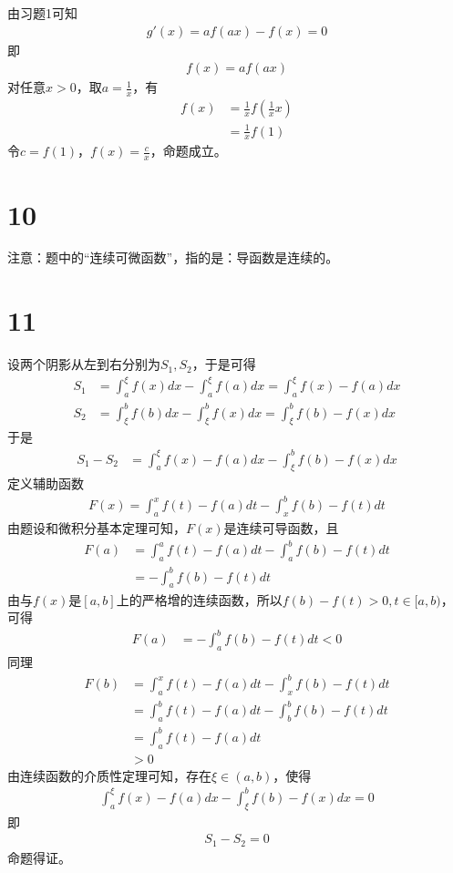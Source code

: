 \documentclass{article}
\begin{document}
由习题1可知
\begin{align*}
  g'(x) = af(ax) - f(x) = 0
\end{align*}
即
\begin{align*}
  f(x) = a f(ax)
\end{align*}
对任意$x > 0$，取$a = \frac{1}{x}$，有
\begin{align*}
  f(x) & = \frac{1}{x} f(\frac{1}{x} x) \\
       & = \frac{1}{x} f(1)
\end{align*}
令$c = f(1)$，$f(x) = \frac{c}{x}$，命题成立。

\section*{10}

注意：题中的“连续可微函数”，指的是：导函数是连续的。

\section*{11}

设两个阴影从左到右分别为$S_1, S_2$，于是可得
\begin{align*}
  S_1 & = \int_{a}^{\xi} f(x) dx - \int_{a}^{\xi} f(a) dx = \int_{a}^{\xi} f(x) - f(a) dx \\
  S_2 & = \int_{\xi}^{b} f(b) dx - \int_{\xi}^{b} f(x) dx = \int_{\xi}^{b} f(b)- f(x) dx
\end{align*}
于是
\begin{align*}
  S_1 - S_2
   & =  \int_{a}^{\xi} f(x) - f(a) dx - \int_{\xi}^{b} f(b)- f(x) dx
\end{align*}
定义辅助函数
\begin{align*}
  F(x) = \int_{a}^{x} f(t) - f(a) dt - \int_{x}^{b} f(b)- f(t) dt
\end{align*}
由题设和微积分基本定理可知，$F(x)$是连续可导函数，且
\begin{align*}
  F(a) & = \int_{a}^{a} f(t) - f(a) dt - \int_{a}^{b} f(b)- f(t) dt \\
       & = - \int_{a}^{b} f(b)- f(t) dt
\end{align*}
由与$f(x)$是$[a, b]$上的严格增的连续函数，所以$f(b) - f(t) > 0, t \in [a, b)$， 可得
\begin{align*}
  F(a) & = - \int_{a}^{b} f(b)- f(t) dt < 0
\end{align*}
同理
\begin{align*}
  F(b) & = \int_{a}^{x} f(t) - f(a) dt - \int_{x}^{b} f(b)- f(t) dt  \\
       & = \int_{a}^{b} f(t) - f(a) dt - \int_{b}^{b} f(b) - f(t) dt \\
       & = \int_{a}^{b} f(t) - f(a) dt                               \\
       & > 0
\end{align*}
由连续函数的介质性定理可知，存在$\xi \in (a, b)$，使得
\begin{align*}
  \int_{a}^{\xi} f(x) - f(a) dx - \int_{\xi}^{b} f(b)- f(x) dx = 0
\end{align*}
即
\begin{align*}
  S_1 - S_2 = 0
\end{align*}
命题得证。
\end{document}
